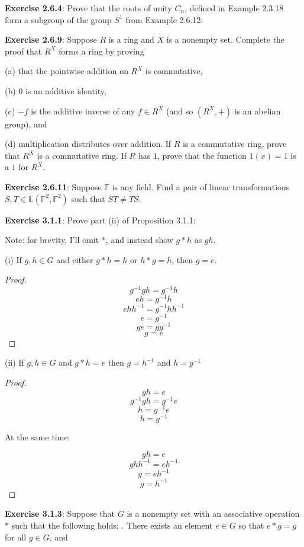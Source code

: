 \documentclass[a4paper]{article}
\begin{document}
\begin{myparindent}{0pt}
\textbf{Exercise 2.6.4}:
Prove that the roots of unity $C_n$, defined in Example 2.3.18 form a subgroup
of the group $S^1$ from Example 2.6.12. \newline

\textbf{Exercise 2.6.9}:
Suppose $R$  is a ring and $X$ is a nonempty set. Complete the proof that $R^X$
forms a ring by proving

(a) that the pointwise addition on $R^X$ is commutative,

(b) 0 is an additive identity,

(c) $-f$ is the additive inverse of any
$f \in R^X$ (and so $(R^X, +)$ is an abelian group), and

(d) multiplication
distributes over addition. If $R$ is a commutative ring, prove that $R^X$ is a
commutative ring. If $R$ has $1$, prove that the function $1(x) = 1$ is a $1$
for $R^X$. \newline

\textbf{Exercise 2.6.11}:
Suppose $\mathbb{F}$ is any field. Find a pair of linear transformations
$S, T \in \mathbb{L}(\mathbb{F}^2, \mathbb{F}^2)$ such that $ST \neq TS$.
\newline

\textbf{Exercise 3.1.1}:
Prove part (ii) of Proposition 3.1.1: \newline

Note: for brevity, I'll omit $*$, and instead show $g * h$ as $gh$.

(i) If $g, h \in G$ and either $g * h = h$ or $h * g = h$, then $g = e$.
\begin{proof}
  \[ g^{-1}gh = g^{-1}h \]
  \[ eh = g^{-1}h \]
  \[ ehh^{-1} = g^{-1}hh^{-1} \]
  \[ e = g^{-1} \]
  \[ ge = gg^{-1} \]
  \[ g = e \]
\end{proof}

(ii) If $g, h \in G$ and $g * h = e$ then $g = h^{-1}$ and $h = g^{-1}$
\begin{proof}
  \[ gh = e \]
  \[ g^{-1}gh = g^{-1}e \]
  \[ h = g^{-1}e \]
  \[ h = g^{-1} \]

  At the same time:

  \[ gh = e \]
  \[ ghh^{-1} = eh^{-1} \]
  \[ g = eh^{-1} \]
  \[ g = h^{-1} \]
\end{proof}

\textbf{Exercise 3.1.3}:
Suppose that $G$ is a nonempty set with an associative operation $*$ such that
the following holds: . There exists an element $e \in G$ so that $e * g = g$ for all $g \in G$, and


\end{myparindent}
\end{document}

